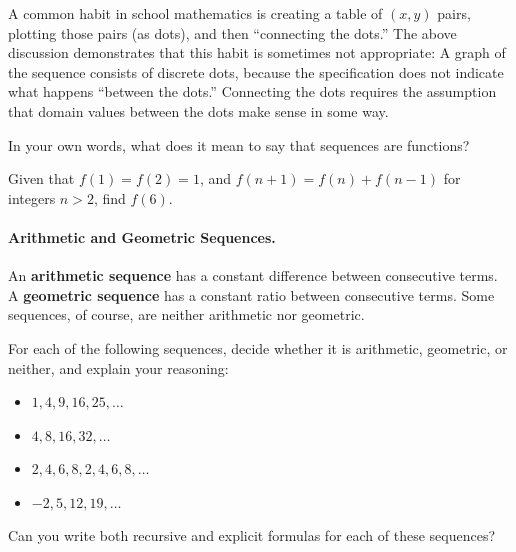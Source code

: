 A common habit in school mathematics is creating a table of $(x,y)$ pairs, plotting those pairs (as dots), and then ``connecting the dots.''  The above discussion demonstrates that this habit is sometimes not appropriate: A graph 
of the sequence consists of discrete dots, because the specification does not indicate what happens ``between the dots.''  Connecting the dots requires the assumption that domain values between the dots make sense in some way.  


\begin{question}
In your own words, what does it mean to say that sequences are functions?
\end{question}

\begin{question}
Given that $f(1) = f(2) = 1$, and $f(n+1) = f(n)+f(n-1)$ for integers $n>2$, find $f(6)$.  
\end{question}

\paragraph{Arithmetic and Geometric Sequences.}  
\begin{definition}
An \textbf{arithmetic sequence} has a constant difference between consecutive terms.  A \textbf{geometric sequence} has a constant ratio between consecutive terms.  Some sequences, of course, are neither arithmetic nor geometric.
\end{definition}
\begin{question}
For each of the following sequences, decide whether it is arithmetic, geometric, or neither, and explain your reasoning:
\begin{itemize}  
\item $1, 4, 9, 16, 25, \dots$
\item $4, 8, 16, 32, \dots$
\item $2, 4, 6, 8, 2, 4, 6, 8, \dots$
\item $-2, 5, 12, 19, \dots$
\end{itemize}
Can you write both recursive and explicit formulas for each of these sequences?  
\end{question}

